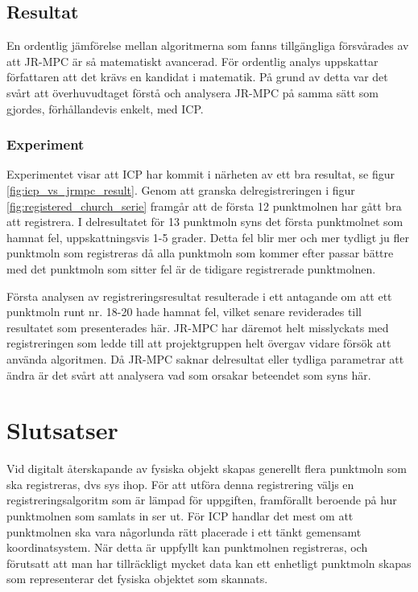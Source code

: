 \subsection{Resultat}

En ordentlig jämförelse mellan algoritmerna som fanns tillgängliga försvårades av att JR-MPC är så matematiskt avancerad. För ordentlig analys uppskattar författaren att det krävs en kandidat i matematik. På grund av detta var det svårt att överhuvudtaget förstå och analysera JR-MPC på samma sätt som gjordes, förhållandevis enkelt, med ICP.


\subsubsection{Experiment}

Experimentet visar att ICP har kommit i närheten av ett bra resultat, se figur \ref{fig:icp_vs_jrmpc_result}. Genom att granska delregistreringen i figur \ref{fig:registered_church_serie} framgår att de första 12 punktmolnen har gått bra att registrera. I delresultatet för 13 punktmoln syns det första punktmolnet som hamnat fel, uppskattningsvis 1-5 grader. Detta fel blir mer och mer tydligt ju fler punktmoln som registreras då alla punktmoln som kommer efter passar bättre med det punktmoln som sitter fel är de tidigare registrerade punktmolnen. 

Första analysen av registreringsresultat resulterade i ett antagande om att ett punktmoln runt nr. 18-20 hade hamnat fel, vilket senare reviderades till resultatet som presenterades här. JR-MPC har däremot helt misslyckats med registreringen som ledde till att projektgruppen helt övergav vidare försök att använda algoritmen. Då JR-MPC saknar delresultat eller tydliga parametrar att ändra är det svårt att analysera vad som orsakar beteendet som syns här.

\section{Slutsatser}
\label{sec:conclusions-karlsson}

Vid digitalt återskapande av fysiska objekt skapas generellt flera punktmoln som ska registreras, dvs sys ihop. För att utföra denna registrering väljs en registreringsalgoritm som är lämpad för uppgiften, framförallt beroende på hur punktmolnen som samlats in ser ut. För ICP handlar det mest om att punktmolnen ska vara någorlunda rätt placerade i ett tänkt gemensamt koordinatsystem. När detta är uppfyllt kan punktmolnen registreras, och förutsatt att man har tillräckligt mycket data kan ett enhetligt punktmoln skapas som representerar det fysiska objektet som skannats.

